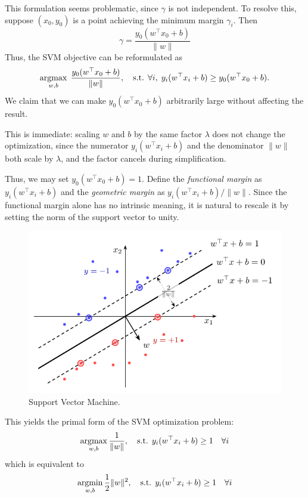 \documentclass[../main]{subfiles}
\begin{document}
This formulation seems problematic, since $\gamma$ is not independent.  
To resolve this, suppose $(x_0, y_0)$ is a point achieving the minimum margin $\gamma_i$.  
Then
\begin{equation}
    \gamma = \frac{y_0 (w^\top x_0 + b)}{\|w\|}
\end{equation}
Thus, the SVM objective can be reformulated as
\begin{equation}
    \mathop{\mathrm{argmax}}_{w,b} \; \frac{y_0 (w^\top x_0 + b)}{\|w\|}, 
    \quad \text{s.t. } \forall i, \; y_i (w^\top x_i + b) \geq y_0 (w^\top x_0 + b).
\end{equation}
We claim that we can make $y_0(w^\top x_0 + b)$ arbitrarily large without affecting the result.

\begin{remark}
    This is immediate: scaling $w$ and $b$ by the same factor $\lambda$ does not change the optimization, since the numerator $y_i(w^\top x_i + b)$ and the denominator $\|w\|$ both scale by $\lambda$, and the factor cancels during simplification.
\end{remark}

Thus, we may set $y_0(w^\top x_0 + b) = 1$.  
Define the \emph{functional margin} as $y_i(w^\top x_i + b)$ and the \emph{geometric margin} as $y_i(w^\top x_i + b)/\|w\|$.  
Since the functional margin alone has no intrinsic meaning, it is natural to rescale it by setting the norm of the support vector to unity.  
\vspace{0.5em}
\begin{figure}[H]
    \centering
    \includegraphics{../../tikz/3/2.pdf}
    \caption{Support Vector Machine.}
    \label{2-lr}
\end{figure}
This yields the primal form of the SVM optimization problem:
\begin{equation}
    \mathop{\mathrm{argmax}}_{w,b} \frac{1}{\|w\|}, 
    \quad \text{s.t. } y_i (w^\top x_i + b) \geq 1 \quad \forall i
\end{equation}
which is equivalent to
\begin{equation}
    \mathop{\mathrm{argmin}}_{w,b} \frac{1}{2} \|w\|^2, 
    \quad \text{s.t. } y_i (w^\top x_i + b) \geq 1 \quad \forall i
\end{equation}
\end{document}
